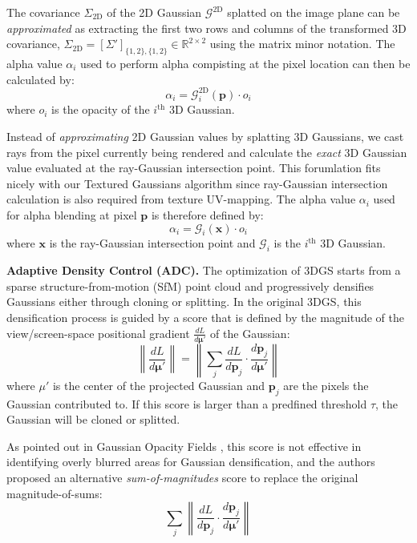 The covariance $\Sigma_\text{2D}$ of the 2D Gaussian $\mathcal{G}^\text{2D}$ splatted on the image plane can be \emph{approximated} as extracting the first two rows and columns of the transformed 3D covariance, $\Sigma_\text{2D} = [\Sigma']_{\{1,2\}, \{1,2\}} \in \mathbb{R}^{2\times2} $ using the matrix minor notation. The alpha value $\alpha_i$ used to perform alpha compisting at the pixel location can then be calculated by:
\begin{equation}
    \alpha_i = \mathcal{G}^{\text{2D}}_i(\mathbf{p})\cdot o_i
\end{equation}
where $o_i$ is the opacity of the $i^\text{th}$ 3D Gaussian.

Instead of \emph{approximating} 2D Gaussian values by splatting 3D Gaussians, we cast rays from the pixel currently being rendered and calculate the \emph{exact} 3D Gaussian value evaluated at the ray-Gaussian intersection point. This forumlation fits nicely with our Textured Gaussians algorithm since ray-Gaussian intersection calculation is also required from texture UV-mapping. The alpha value $\alpha_i$ used for alpha blending at pixel $\mathbf{p}$ is therefore defined by:
\begin{equation}
    \alpha_i = \mathcal{G}_i(\mathbf{x})\cdot o_i
\end{equation}
where $\mathbf{x}$ is the ray-Gaussian intersection point and $\mathcal{G}_i$ is the $i^\text{th}$ 3D Gaussian. 

\noindent \textbf{Adaptive Density Control (ADC). } The optimization of 3DGS starts from  a sparse structure-from-motion (SfM) point cloud and progressively densifies Gaussians either through cloning or splitting. In the original 3DGS, this densification process is guided by a score that is defined by the magnitude of the view/screen-space positional gradient $\frac{dL}{d\bm{\mu}'}$ of the Gaussian:
\begin{equation}
    \left\| \frac{dL}{d\bm{\mu}'} \right\|= \left\|\sum_j \frac{dL}{d\mathbf{p}_j} \cdot \frac{d\mathbf{p}_j}{d\bm{\mu}'}\right\|
\end{equation}
where $\mu'$ is the center of the projected Gaussian and $\mathbf{p}_j$ are the pixels the Gaussian contributed to. If this score is larger than a predfined threshold $\tau$, the Gaussian will be cloned or splitted.

As pointed out in Gaussian Opacity Fields \cite{Yu2024GOF}, this score is not effective in identifying overly blurred areas for Gaussian densification, and the authors proposed an alternative \emph{sum-of-magnitudes} score to replace the original magnitude-of-sums:
\begin{equation}
    \sum_j \left\|\frac{dL}{d\mathbf{p}_j} \cdot \frac{d\mathbf{p}_j}{d\bm{\mu}'}\right\|
\end{equation}

